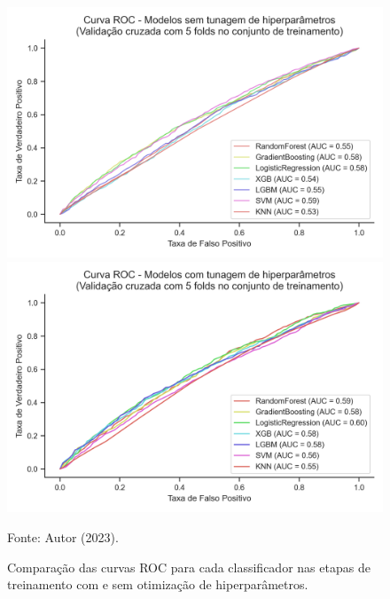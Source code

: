 \begin{figure}
	\centering
	\caption{\label{img:curvasRocComTunagem}Comparação das curvas ROC para cada classificador nas etapas de treinamento com e sem otimização de hiperparâmetros.}
	
	\begin{minipage}[t]{0.45\textwidth}
		\centering
		\includegraphics[width=\textwidth]{USPSC-img/curva_roc_modelos_sem_tunagem_hiperparametros.png}
	\end{minipage}
	\hfill
	\begin{minipage}[t]{0.45\textwidth}
		\centering
		\includegraphics[width=\textwidth]{USPSC-img/curva_roc_modelos_com_tunagem_hiperparametros.png}
	\end{minipage}
	
	\begin{center}
		Fonte: Autor (2023).
	\end{center}
\end{figure}

